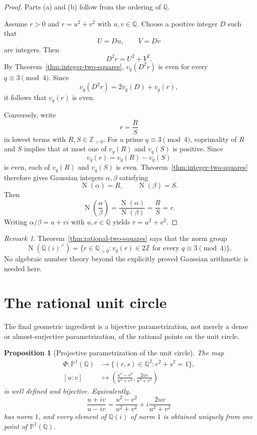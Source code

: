 \documentclass[11pt,a4paper]{article}
\numberwithin{equation}{section}
\newtheorem{proposition}[theorem]{Proposition}
\theoremstyle{definition}
\theoremstyle{remark}
\newtheorem{remark}[theorem]{Remark}
\newcommand{\Z}{\mathbb Z}
\newcommand{\Q}{\mathbb Q}
\newcommand{\PP}{\mathbb P}
\newcommand{\Qi}{\Q(i)}
\newcommand{\Norm}{\operatorname{N}}
\begin{document}
\begin{proof}
Parts (a) and (b) follow from the ordering of $\Q$.

Assume $r>0$ and $r=u^2+v^2$ with $u,v\in\Q$. Choose a positive integer $D$ such that
\[
 U=Du,
 \qquad
 V=Dv
\]
are integers. Then
\[
 D^2r=U^2+V^2.
\]
By Theorem~\ref{thm:integer-two-squares}, $v_q(D^2r)$ is even for every $q\equiv3\pmod4$. Since
\[
 v_q(D^2r)=2v_q(D)+v_q(r),
\]
it follows that $v_q(r)$ is even.

Conversely, write
\[
 r=\frac RS
\]
in lowest terms with $R,S\in\Z_{>0}$. For a prime $q\equiv3\pmod4$, coprimality of $R$ and $S$ implies that at most one of $v_q(R)$ and $v_q(S)$ is positive. Since
\[
 v_q(r)=v_q(R)-v_q(S)
\]
is even, each of $v_q(R)$ and $v_q(S)$ is even. Theorem~\ref{thm:integer-two-squares} therefore gives Gaussian integers $\alpha,\beta$ satisfying
\[
 \Norm(\alpha)=R,
 \qquad
 \Norm(\beta)=S.
\]
Then
\[
 \Norm\left(\frac\alpha\beta\right)
 =\frac{\Norm(\alpha)}{\Norm(\beta)}
 =\frac RS=r.
\]
Writing $\alpha/\beta=u+vi$ with $u,v\in\Q$ yields $r=u^2+v^2$.
\end{proof}

\begin{remark}
Theorem~\ref{thm:rational-two-squares} says that the norm group
\[
 \Norm(\Qi^\times)
 =\{r\in\Q_{>0}:v_q(r)\in2\Z\text{ for every }q\equiv3\pmod4\}.
\]
No algebraic number theory beyond the explicitly proved Gaussian arithmetic is needed here.
\end{remark}

\section{The rational unit circle}
\label{sec:unit-circle}

The final geometric ingredient is a bijective parametrization, not merely a dense or almost-surjective parametrization, of the rational points on the unit circle.

\begin{proposition}[Projective parametrization of the unit circle]
\label{prop:unit-circle}
The map
\begin{align}
 \Phi:\PP^1(\Q)&\longrightarrow
 \{(r,s)\in\Q^2:r^2+s^2=1\},
 \label{eq:phi-domain}\\
 [u:v]&\longmapsto
 \left(
 \frac{u^2-v^2}{u^2+v^2},
 \frac{2uv}{u^2+v^2}
 \right)
 \label{eq:phi-formula}
\end{align}
is well defined and bijective. Equivalently,
\begin{equation}
 \frac{u+iv}{u-iv}
 =\frac{u^2-v^2}{u^2+v^2}
  +i\frac{2uv}{u^2+v^2}
 \label{eq:unit-gaussian}
\end{equation}
has norm $1$, and every element of $\Qi$ of norm $1$ is obtained uniquely from one point of $\PP^1(\Q)$.
\end{proposition}
\end{document}

